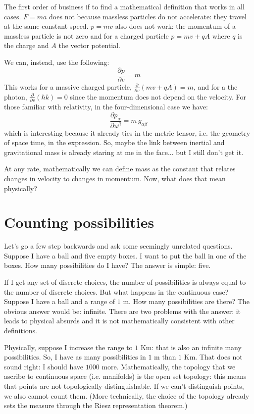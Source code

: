 \documentclass[aps,pra,10pt,floatfix,nofootinbib]{revtex4-1}
\theoremstyle{definition}
\begin{document}
The first order of business if to find a mathematical definition that works in all cases. $F=ma$ does not because massless particles do not accelerate: they travel at the same constant speed. $p=mv$ also does not work: the momentum of a massless particle is not zero and for a charged particle $p=mv + qA$ where $q$ is the charge and $A$ the vector potential.

We can, instead, use the following:
\begin{equation}
\label{simpleMass}
\frac{\partial p}{\partial v} = m
\end{equation}
This works for a massive charged particle, $\frac{\partial}{\partial v} (mv + qA) = m$, and for a the photon, $\frac{\partial}{\partial v} (\hbar k) = 0$ since the momentum does not depend on the velocity. For those familiar with relativity, in the four-dimensional case we have:
\begin{equation}
\label{advancedMass}
\frac{\partial p_\alpha}{\partial u^\beta} = m \, g_{\alpha \beta}
\end{equation}
which is interesting because it already ties in the metric tensor, i.e. the geometry of space time, in the expression. So, maybe the link between inertial and gravitational mass is already staring at me in the face... but I still don't get it. 

At any rate, mathematically we can define mass as the constant that relates changes in velocity to changes in momentum. Now, what does that mean physically?

\section{Counting possibilities}

Let's go a few step backwards and ask some seemingly unrelated questions. Suppose I have a ball and five empty boxes. I want to put the ball in one of the boxes. How many possibilities do I have? The answer is simple: five.

If I get any set of discrete choices, the number of possibilities is always equal to the number of discrete choices. But what happens in the continuous case? Suppose I have a ball and a range of $1$ m. How many possibilities are there? The obvious answer would be: infinite. There are two problems with the answer: it leads to physical absurds and it is not mathematically consistent with other definitions.

Physically, suppose I increase the range to $1$ Km: that is also an infinite many possibilities. So, I have as many possibilities in $1$ m than $1$ Km. That does not sound right: I should have $1000$ more. Mathematically, the topology that we ascribe to continuous space (i.e. manifolds) is the open set topology: this means that points are not topologically distinguishable. If we can't distinguish points, we also cannot count them. (More technically, the choice of the topology already sets the measure through the Riesz representation theorem.)
\end{document}
